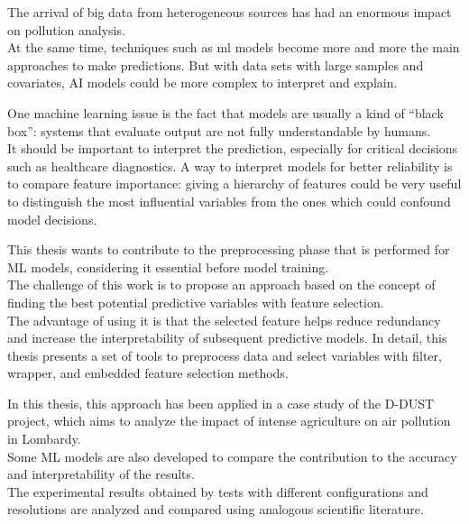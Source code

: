 The arrival of big data from heterogeneous sources has had an enormous impact on pollution analysis.\\
At the same time, techniques such as \gls{ml} models become more and more the main approaches to make predictions. But with data sets with large samples and covariates, AI models could be more complex to interpret and explain.\par
One machine learning issue is the fact that models are usually a kind of “black box”: systems that evaluate output are not fully understandable by humans. \\
It should be important to interpret the prediction, especially for critical decisions such as healthcare diagnostics.
A way to interpret models for better reliability is to compare feature importance: giving a hierarchy of features could be very useful to distinguish the most influential variables from the ones which could confound model decisions.\par
This thesis wants to contribute to the preprocessing phase that is performed for ML models, considering it essential before model training.\\
The challenge of this work is to propose an approach based on the concept of finding the best potential predictive variables with feature selection.\\
The advantage of using it is that the selected feature helps reduce redundancy and increase the interpretability of subsequent predictive models.
In detail, this thesis presents a set of tools to preprocess data and select variables with filter, wrapper, and embedded feature selection methods.\par
In this thesis, this approach has been applied in a case study of the D-DUST project, which aims to analyze the impact of intense agriculture on air pollution in Lombardy.\\
Some ML models are also developed to compare the contribution to the accuracy and interpretability of the results.\\
The experimental results obtained by tests with different configurations and resolutions are analyzed and compared using analogous scientific literature.
\\
\\